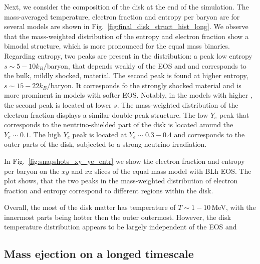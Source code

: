 Next, we consider the composition of the disk at the end of the simulation.
%
The mass-averaged temperature, electron fraction and entropy per baryon
are for several models are shown in Fig.~\ref{fig:final_disk_struct_hist_long}.
%
We observe that the mass-weighted distribution of the entropy and electron 
fraction show a bimodal structure, which is more pronounced for the 
equal mass binaries. 
Regarding entropy, two peaks are present in the distribution:
a peak low entropy $s\sim5-10k_B/$baryon, that depends weakly of the 
\ac{EOS} and \mr{} and corresponds to the bulk, mildly shocked, material. 
The second peak is found at higher entropy, $s\sim15-22k_B/$baryon.
It corresponds fo the strongly shocked material and is more prominent 
in models with softer \ac{EOS}.
Notably, in the models with higher \mr{}, the second peak is located 
at lower $s$.
The mass-weighted distribution of the electron fraction 
displays a similar double-peak structure.
The low $Y_e$ peak that corresponds to the neutrino-shielded part of the 
disk is located around the $Y_e\sim0.1$.
The high $Y_e$ peak is located at $Y_e\sim0.3-0.4$ and corresponds to the outer 
parts of the disk, subjected to a strong neutrino irradiation.

In Fig.~\ref{fig:snapshots_xy_ye_entr} we show the electron fraction 
and entropy per baryon on the $xy$ and $xz$ slices of the equal 
mass model with BLh \ac{EOS}.
The plot shows, that the two peaks in the mass-weighted distribution 
of electron fraction and entropy correspond to different regions within the disk.

Overall, the most of the disk matter has temperature of $T\sim 1-10\,$MeV, with the 
innermost parts being hotter then the outer outermost. 
However, the disk temperature distribution appears to be largely 
independent of the \ac{EOS} and \mr{}



\subsection{Mass ejection on a longed timescale}

